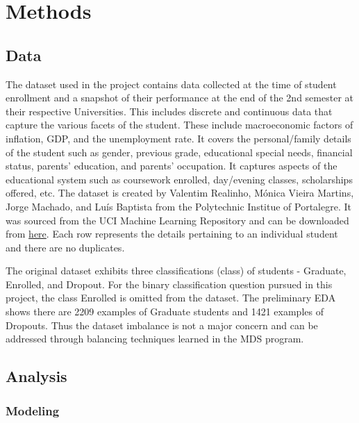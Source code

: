 \documentclass[
]{article}
\begin{document}
\hypertarget{methods}{%
\section{Methods}\label{methods}}

\hypertarget{data}{%
\subsection{Data}\label{data}}

The dataset used in the project contains data collected at the time of
student enrollment and a snapshot of their performance at the end of the
2nd semester at their respective Universities. This includes discrete
and continuous data that capture the various facets of the student.
These include macroeconomic factors of inflation, GDP, and the
unemployment rate. It covers the personal/family details of the student
such as gender, previous grade, educational special needs, financial
status, parents' education, and parents' occupation. It captures aspects
of the educational system such as coursework enrolled, day/evening
classes, scholarships offered, etc. The dataset is created by Valentim
Realinho, Mónica Vieira Martins, Jorge Machado, and Luís Baptista from
the Polytechnic Institue of Portalegre. It was sourced from the UCI
Machine Learning Repository and can be downloaded from
\href{https://archive-beta.ics.uci.edu/dataset/697/predict+students+dropout+and+academic+success}{here}.
Each row represents the details pertaining to an individual student and
there are no duplicates.

The original dataset exhibits three classifications (class) of students
- Graduate, Enrolled, and Dropout. For the binary classification
question pursued in this project, the class Enrolled is omitted from the
dataset. The preliminary EDA shows there are 2209 examples of Graduate
students and 1421 examples of Dropouts. Thus the dataset imbalance is
not a major concern and can be addressed through balancing techniques
learned in the MDS program.

\hypertarget{analysis}{%
\subsection{Analysis}\label{analysis}}

\hypertarget{modeling}{%
\subsubsection{Modeling}\label{modeling}}
\end{document}
